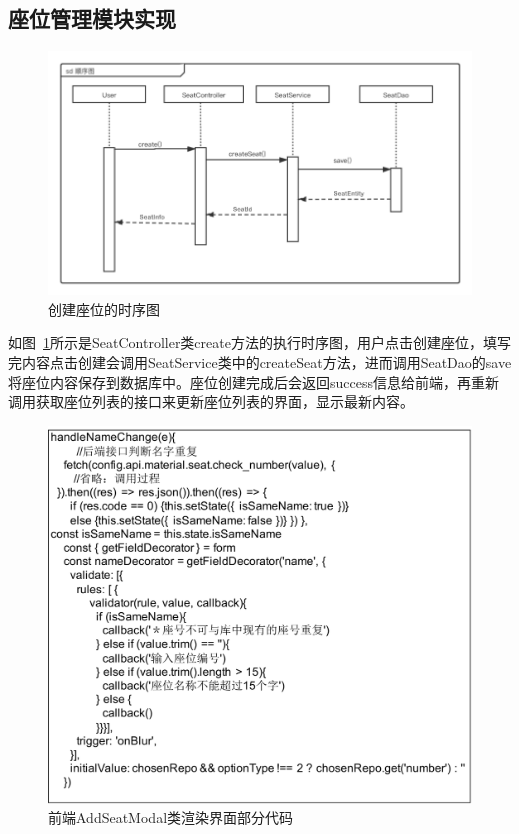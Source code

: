\subsection{座位管理模块实现}
\begin{figure}[htbp!]
    \centering
    \includegraphics[width=5in]{FIGs/chapter4/seat_time.pdf}
    \caption{创建座位的时序图}\label{fig_seat_time}
\end{figure}

如图~\ref{fig_seat_time}所示是SeatController类create方法的执行时序图，用户点击创建座位，填写完内容点击创建会调用SeatService类中的createSeat方法，进而调用SeatDao的save将座位内容保存到数据库中。座位创建完成后会返回success信息给前端，再重新调用获取座位列表的接口来更新座位列表的界面，显示最新内容。

\begin{figure}[htbp!]
    \centering
    \includegraphics[width=4.5in]{FIGs/chapter4/8.pdf}
    \caption{前端AddSeatModal类渲染界面部分代码}\label{fig_seat_8}
\end{figure}

